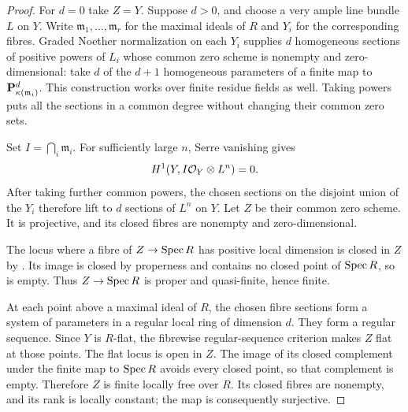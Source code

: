 \begin{proof}
For $d=0$ take $Z=Y$. Suppose $d>0$, and choose a very ample line
bundle $L$ on $Y$. Write $\mathfrak m_1,\ldots,\mathfrak m_r$ for the
maximal ideals of $R$ and $Y_i$ for the corresponding fibres.
Graded Noether normalization on each $Y_i$ supplies $d$ homogeneous
sections of positive powers of $L_i$ whose common zero scheme is
nonempty and zero-dimensional: take $d$ of the $d+1$ homogeneous
parameters of a finite map to $\mathbf P^d_{\kappa(\mathfrak m_i)}$.
This construction works over finite residue fields as well.
Taking powers puts all the sections in a common degree without
changing their common zero sets.

Set $I=\bigcap_i\mathfrak m_i$. For sufficiently large $n$, Serre
vanishing gives
\[
 H^1(Y,I\mathcal O_Y\otimes L^n)=0.
\]
After taking further common powers, the chosen sections on the disjoint
union of the $Y_i$ therefore lift to $d$ sections of $L^n$ on $Y$.
Let $Z$ be their common zero scheme. It is projective, and its closed
fibres are nonempty and zero-dimensional.

The locus where a fibre of $Z\to\operatorname{Spec} R$ has positive local dimension
is closed in $Z$ by \cite[IV$_3$, 13.1.3]{EGA}. Its image is closed
by properness and contains no closed point of $\operatorname{Spec} R$, so is empty.
Thus $Z\to\operatorname{Spec} R$ is proper and quasi-finite, hence finite.

At each point above a maximal ideal of $R$, the chosen fibre sections
form a system of parameters in a regular local ring of dimension $d$.
They form a regular sequence. Since $Y$ is $R$-flat, the fibrewise
regular-sequence criterion \cite[IV$_3$, 11.3.8]{EGA} makes $Z$ flat
at those points. The flat locus is open in $Z$. The image of its
closed complement under the finite map to $\operatorname{Spec} R$ avoids every
closed point, so that complement is empty. Therefore $Z$ is finite
locally free over $R$. Its closed fibres are nonempty, and its rank
is locally constant; the map is consequently surjective.
\end{proof}

